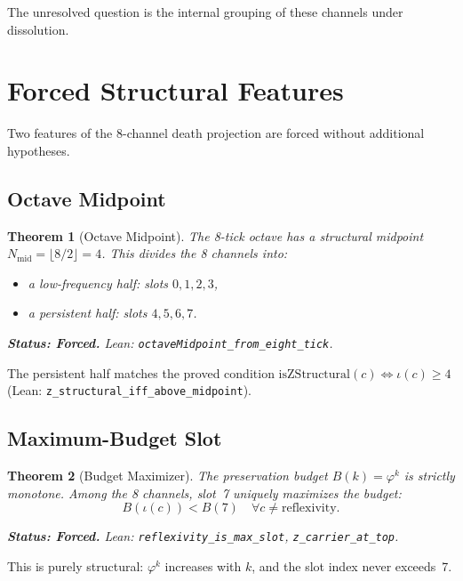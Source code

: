 \documentclass[11pt,a4paper]{article}
\newtheorem{theorem}{Theorem}[section]
\theoremstyle{definition}
\newcommand{\phig}{\varphi}
\newcommand{\code}[1]{\texttt{\small #1}}
\newcommand{\forced}[1]{\noindent\textbf{Status: Forced.} #1}
\begin{document}
The unresolved question is the internal grouping of these channels
under dissolution.

\section{Forced Structural Features}
\label{sec:forced}

Two features of the 8-channel death projection are forced without
additional hypotheses.

\subsection{Octave Midpoint}

\begin{theorem}[Octave Midpoint]
\label{thm:midpoint}
The 8-tick octave has a structural midpoint
$N_{\mathrm{mid}} = \lfloor 8/2 \rfloor = 4$.
This divides the 8 channels into:
\begin{itemize}
\item a low-frequency half: slots $0,1,2,3$,
\item a persistent half: slots $4,5,6,7$.
\end{itemize}

\forced{Lean: \code{octaveMidpoint\_from\_eight\_tick}.}
\end{theorem}

The persistent half matches the proved condition
$\mathrm{isZStructural}(c) \iff \iota(c)\ge 4$
(Lean: \code{z\_structural\_iff\_above\_midpoint}).

\subsection{Maximum-Budget Slot}

\begin{theorem}[Budget Maximizer]
\label{thm:max-budget}
The preservation budget $B(k)=\phig^k$ is strictly monotone.
Among the 8 channels, slot~7 uniquely maximizes the budget:
\[
  B(\iota(c)) < B(7) \quad \forall c \ne \mathrm{reflexivity}.
\]

\forced{Lean: \code{reflexivity\_is\_max\_slot},
\code{z\_carrier\_at\_top}.}
\end{theorem}

This is purely structural: $\phig^k$ increases with $k$, and the slot
index never exceeds~7.
\end{document}
